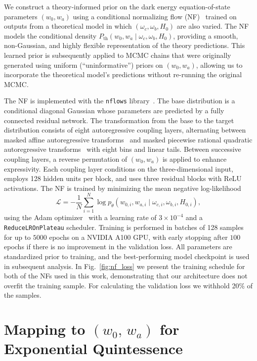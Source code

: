 \documentclass[floats,floatfix,showpacs,amssymb,prd,twocolumn,superscriptaddress,nofootinbib,reprint,preprintnumbers]{revtex4-2}
\begin{document}
We construct a theory-informed prior on the dark energy equation-of-state parameters $(w_0, w_a)$ using a conditional normalizing flow (NF)~\cite{2015arXiv150505770J, 2017arXiv170507057P} trained on outputs from a theoretical model in which $(\omega_c, \omega_b, H_0)$ are also varied. The NF models the conditional density $P_{\mathrm{th}}(w_0, w_a \mid \omega_c, \omega_b, H_0)$, providing a smooth, non-Gaussian, and highly flexible representation of the theory predictions. This learned prior is subsequently applied to MCMC chains that were originally generated using uniform (“uninformative”) priors on $(w_0, w_a)$, allowing us to incorporate the theoretical model's predictions without re-running the original MCMC.

The NF is implemented with the \texttt{nflows} library~\cite{2023JOSS....8.5361S}. The base distribution is a conditional diagonal Gaussian whose parameters are predicted by a fully connected residual network. The transformation from the base to the target distribution consists of eight autoregressive coupling layers, alternating between masked affine autoregressive transforms~\cite{2017arXiv170507057P} and masked piecewise rational quadratic autoregressive transforms~\cite{2019arXiv190604032D} with eight bins and linear tails. Between successive coupling layers, a reverse permutation of $(w_0, w_a)$ is applied to enhance expressivity. Each coupling layer conditions on the three-dimensional input, employs 128 hidden units per block, and uses three residual blocks with ReLU activations. The NF is trained by minimizing the mean negative log-likelihood
\begin{equation}
    \mathcal{L} = - \frac{1}{N} \sum_{i=1}^N \log p_\theta(w_{0,i}, w_{a,i} \mid \omega_{c,i}, \omega_{b,i}, H_{0,i}),
\end{equation}
using the Adam optimizer~\cite{Kingma:2014vow} with a learning rate of $3\times 10^{-4}$ and a \texttt{ReduceLROnPlateau} scheduler. Training is performed in batches of 128 samples for up to $5000$ epochs on a NVIDIA A100 GPU, with early stopping after $100$ epochs if there is no improvement in the validation loss. All parameters are standardized prior to training, and the best-performing model checkpoint is used in subsequent analysis. In Fig.~\ref{fig:nf_loss} we present the training schedule for both of the NFs used in this work, demonstrating that our architecture does not overfit the training sample. For calculating the validation loss we withhold 20\% of the samples.
\clearpage
\section{Mapping to $(w_0,\,w_a)$ for Exponential Quintessence}
\end{document}

